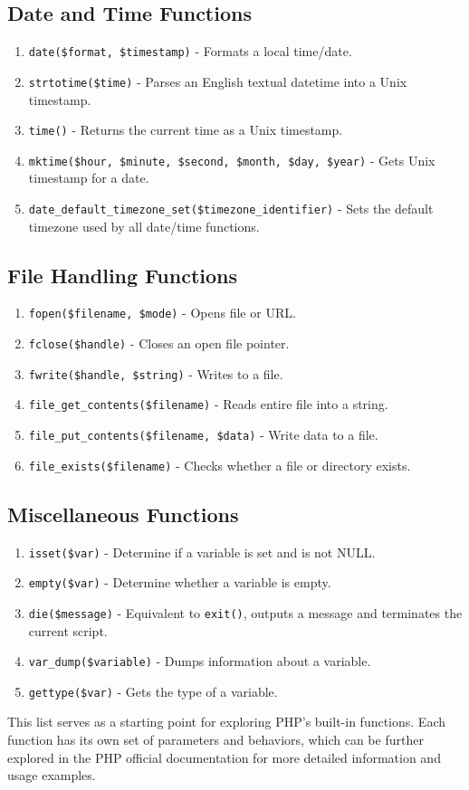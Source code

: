 \documentclass[11pt]{article}
\begin{document}
\subsection{Date and Time Functions}
\label{sec:org88dda10}
\begin{enumerate}
\item \texttt{date(\$format, \$timestamp)} - Formats a local time/date.
\item \texttt{strtotime(\$time)} - Parses an English textual datetime into a Unix
timestamp.
\item \texttt{time()} - Returns the current time as a Unix timestamp.
\item \texttt{mktime(\$hour, \$minute, \$second, \$month, \$day, \$year)} - Gets Unix
timestamp for a date.
\item \texttt{date\_default\_timezone\_set(\$timezone\_identifier)} - Sets the default
timezone used by all date/time functions.
\end{enumerate}

\subsection{File Handling Functions}
\label{sec:org5c15f3d}
\begin{enumerate}
\item \texttt{fopen(\$filename, \$mode)} - Opens file or URL.
\item \texttt{fclose(\$handle)} - Closes an open file pointer.
\item \texttt{fwrite(\$handle, \$string)} - Writes to a file.
\item \texttt{file\_get\_contents(\$filename)} - Reads entire file into a string.
\item \texttt{file\_put\_contents(\$filename, \$data)} - Write data to a file.
\item \texttt{file\_exists(\$filename)} - Checks whether a file or directory exists.
\end{enumerate}

\subsection{Miscellaneous Functions}
\label{sec:org9a15a29}
\begin{enumerate}
\item \texttt{isset(\$var)} - Determine if a variable is set and is not NULL.
\item \texttt{empty(\$var)} - Determine whether a variable is empty.
\item \texttt{die(\$message)} - Equivalent to \texttt{exit()}, outputs a message and
terminates the current script.
\item \texttt{var\_dump(\$variable)} - Dumps information about a variable.
\item \texttt{gettype(\$var)} - Gets the type of a variable.
\end{enumerate}

This list serves as a starting point for exploring PHP's built-in
functions. Each function has its own set of parameters and behaviors,
which can be further explored in the PHP official documentation for more
detailed information and usage examples.
\end{document}
